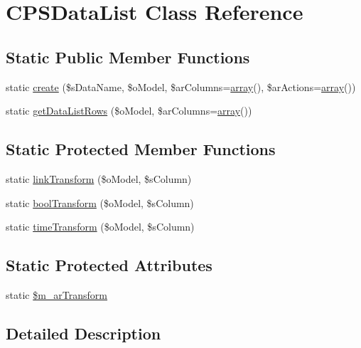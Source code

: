 \hypertarget{classCPSDataList}{
\section{CPSDataList Class Reference}
\label{classCPSDataList}
}
\subsection*{Static Public Member Functions}
\begin{DoxyCompactItemize}
\item 
static \hyperlink{classCPSDataList_af8ad9ff1a49c4c522a8c7823d03e0785}{create} (\$sDataName, \$oModel, \$arColumns=\hyperlink{list_8php_aa3205d038c7f8feb5c9f01ac4dfadc88}{array}(), \$arActions=\hyperlink{list_8php_aa3205d038c7f8feb5c9f01ac4dfadc88}{array}())
\item 
static \hyperlink{classCPSDataList_a22bdd6eac785a6ad5ce1231f56955c7a}{getDataListRows} (\$oModel, \$arColumns=\hyperlink{list_8php_aa3205d038c7f8feb5c9f01ac4dfadc88}{array}())
\end{DoxyCompactItemize}
\subsection*{Static Protected Member Functions}
\begin{DoxyCompactItemize}
\item 
static \hyperlink{classCPSDataList_ae36b6e416bd99d1b240570c2e51624f2}{linkTransform} (\$oModel, \$sColumn)
\item 
static \hyperlink{classCPSDataList_a7868e4696a97c2cb65781218abbb4a9f}{boolTransform} (\$oModel, \$sColumn)
\item 
static \hyperlink{classCPSDataList_a25508a36959b2176c90f297814aba604}{timeTransform} (\$oModel, \$sColumn)
\end{DoxyCompactItemize}
\subsection*{Static Protected Attributes}
\begin{DoxyCompactItemize}
\item 
static \hyperlink{classCPSDataList_a02daa717c378ec40ccd5c56792be79b6}{\$m\_\-arTransform}
\end{DoxyCompactItemize}


\subsection{Detailed Description}


